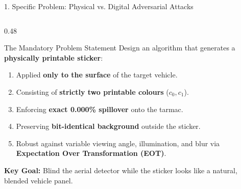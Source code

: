 \documentclass[aspectratio=169, 10pt]{beamer}
\begin{document}
\begin{frame}{1. Specific Problem: Physical vs. Digital Adversarial Attacks}
\begin{columns}[T]
  \begin{column}{0.48\textwidth}
    \begin{exampleblock}{The Mandatory Problem Statement}
      Design an algorithm that generates a \textbf{physically printable sticker}:
      \begin{enumerate}\small
        \item Applied \textbf{only to the surface} of the target vehicle.
        \item Consisting of \textbf{strictly two printable colours} ($c_0, c_1$).
        \item Enforcing \textbf{exact 0.000\% spillover} onto the tarmac.
        \item Preserving \textbf{bit-identical background} outside the sticker.
        \item Robust against variable viewing angle, illumination, and blur via \textbf{Expectation Over Transformation (EOT)}.
      \end{enumerate}
    \end{exampleblock}
    
    \begin{center}
      \footnotesize\textcolor{NavyBlue}{\textbf{Key Goal:} Blind the aerial detector while the sticker looks like a natural, blended vehicle panel.}
    \end{center}
  \end{column}
\end{columns}
\end{frame}
\end{document}
